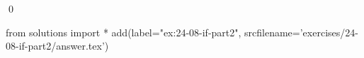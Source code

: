 
\begin{ex}
  \label{ex:24-08-if-part2}
  
  \qed
\end{ex}
\begin{python0}
from solutions import *
add(label="ex:24-08-if-part2",
    srcfilename='exercises/24-08-if-part2/answer.tex')
\end{python0}
